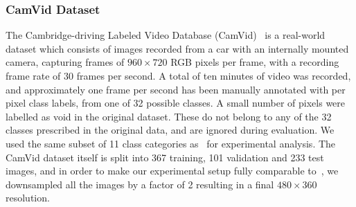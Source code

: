 \documentclass[times,art10,twocolumn,latex8]{article}
\begin{document}
\subsubsection{CamVid Dataset}
The Cambridge-driving Labeled Video Database
(CamVid)~\cite{Brostow2010semantic} is a real-world dataset which consists of
images recorded from a car with an internally mounted camera, capturing frames
of $960 \times 720$ RGB pixels per frame, with a recording frame rate of 30
frames per second. A total of ten minutes of video was recorded, and
approximately one frame per second has been manually annotated with per pixel
class labels, from one of 32 possible classes.  A small number of pixels were
labelled as void in the original dataset. These do not belong to any of the 32
classes prescribed in the original data, and are ignored during evaluation.  We
used the same subset of 11 class categories as~\cite{badrinarayanan2015segnet}
for experimental analysis.  The CamVid dataset itself is split into 367
training, 101 validation and 233 test images, and in order to make our
experimental setup fully comparable to~\cite{badrinarayanan2015segnet}, we
downsampled all the images by a factor of 2 resulting in a final $480 \times
360$ resolution.
\end{document}

